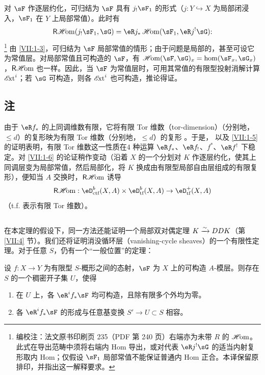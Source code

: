 对 $\sF$ 作逐层约化，可归结为 $\sF$ 具有 $j_!\sF_1$ 的形式（$j:Y\hookrightarrow X$ 为局部闭浸入，$\sF_1$ 在 $Y$ 上局部常值）。此时有
\[
  \rHom(j_! \sF_1,\sG) = \eR j_\ast \Hom(\sF_1,\eR j^! \sG) \text{:}
\]\footnote{编校注：法文原书印刷页 235（PDF 第 240 页）右端亦为未带 $R$ 的 $\operatorname{\mathscr{H}\!om}$。此式在导出范畴中须将右端内 Hom 导出，或对代表 $\eR j^!\sG$ 的适当内射复形取内 Hom；仅假设 $\sF_1$ 局部常值不能保证普通内 Hom 正合。本译保留原排印，并指出这一解释要求。}
由 \ref{VII:1-3}，可归结为 $\sF$ 局部常值的情形；由于问题是局部的，甚至可设它为常值层。对局部常值且可构造的 $\sF$，有 $\Hom(\sF,\sG)_x=\hom(\sF_x,\sG_x)$，$\operatorname{\mathsf{R}\mathscr{H}\!om}$ 也一样。因此，当 $\sF$ 为常值层时，可用其常值的有限型投射消解计算 $\operatorname{\mathscr{E}\!xt}^i$；若 $\sG$ 可构造，则各 $\operatorname{\mathscr{E}\!xt}^i$ 也可构造，推论得证。

\subsection{注}\label{VII:1-7}

由于 $\eR f_\ast$ 的上同调维数有限，它将有限 Tor 维数（tor-dimension）（分别地，$\leqslant d$）的复形映为有限 Tor 维数（分别地，$\leqslant d$）的复形 \cite[XVII 5.2.11]{sga4}。于是，\cite[XVII 5.2.10]{sga4} 以及 \ref{VII:1-5} 的证明表明，有限 Tor 维数这一性质在$4$ 种运算 $\eR f_\ast$、$\eR f_!$、$f^\ast$、$\eR f^!$ 下稳定。对 \ref{VII:1-6} 的论证稍作变动（沿着 $X$ 的一个分划对 $K$ 作逐层约化，使其上同调层变为局部常值，然后局部化，将 $K$ 换成由有限型局部自由层组成的有限复形），便知当 $A$ 交换时，$\operatorname{\mathsf{R}\mathscr{H}\!om}$ 诱导
\[
  \rHom:\eD_\text{ctf}^b(X,A)\times \eD_\text{tf}^b(X,A) \to \eD_\text{tf}^+(X,A)
\]
（t.f. 表示有限 Tor 维数）。

\subsection{}\label{VII:1-8}

在本定理的假设下，同一方法还能证明一个局部双对偶定理 $K\xrightarrow\sim D D K$（第 \ref{VII:4} 节）。我们还将证明消没循环层（vanishing-cycle sheaves）的一个有限性定理。对于任意 $S$，仍有一个“一般位置”的定理：

\begin{theorem_}\label{VII:1-9}
设 $f:X\to Y$ 为有限型 $S$-概形之间的态射，$\sF$ 为 $X$ 上的可构造 $A$-模层。则存在 $S$ 的一个稠密开子集 $U$，使得
\begin{enumerate}[\indent (i)]
  \item 在 $U$ 上，各 $\eR^i f_\ast \sF$ 均可构造，且除有限多个外均为零。
  \item 各 $\eR^i f_\ast \sF$ 的形成与任意基变换 $S' \to U\subset S$ 相容。
\end{enumerate}
\end{theorem_}

